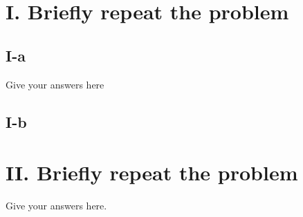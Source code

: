 \documentclass[twoside,a4paper]{article}
\begin{document}
\pagestyle{fancy}
\fancyhead{}


\section*{I. Briefly repeat the problem}

\subsection*{I-a} 

Give your answers here

\subsection*{I-b} 

\section*{II. Briefly repeat the problem}

Give your answers here.
\end{document}

